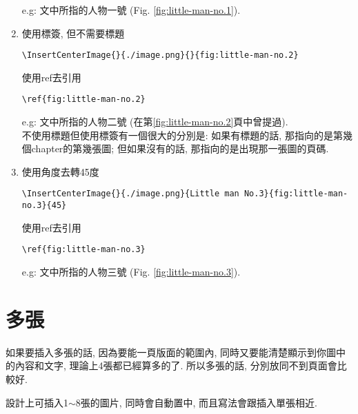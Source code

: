 \begin{enumerate}
{      e.g: 文中所指的人物一號 (Fig. \ref{fig:little-man-no.1}).
    } %

    \newpage

    \item
    {
      使用標簽, 但不需要標題\begin{verbatim}\InsertCenterImage{}{./image.png}{}{fig:little-man-no.2}\end{verbatim}
      使用ref去引用\begin{verbatim}\ref{fig:little-man-no.2}\end{verbatim}

      e.g: 文中所指的人物二號 (在第\ref{fig:little-man-no.2}頁中曾提過). \\

      不使用標題但使用標簽有一個很大的分別是: 如果有標題的話, 那指向的是第幾個chapter的第幾張圖; 但如果沒有的話, 那指向的是出現那一張圖的頁碼.
    } %

    \item
    {
      使用角度去轉45度\begin{verbatim}\InsertCenterImage{}{./image.png}{Little man No.3}{fig:little-man-no.3}{45}\end{verbatim}
      使用ref去引用\begin{verbatim}\ref{fig:little-man-no.3}\end{verbatim}


      e.g: 文中所指的人物三號 (Fig. \ref{fig:little-man-no.3}).
    } %

  \end{enumerate}

\newpage
\section{多張}

  如果要插入多張的話, 因為要能一頁版面的範圍內, 同時又要能清楚顯示到你圖中的內容和文字, 理論上4張都已經算多的了. 所以多張的話, 分別放同不到頁面會比較好.

  設計上可插入1$\sim$8張的圖片, 同時會自動置中, 而且寫法會跟插入單張相近.

